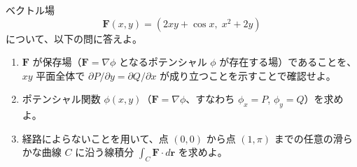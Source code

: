 
ベクトル場
\[
\bm{F}(x,y) = \left(2xy + \cos x,\; x^{2} + 2y\right)
\]
について、以下の問に答えよ。
\begin{enumerate}
\item $\bm{F}$ が保存場（$\bm{F} = \nabla \phi$ となるポテンシャル $\phi$ が存在する場）であることを、$xy$ 平面全体で $\partial P/\partial y = \partial Q/\partial x$ が成り立つことを示すことで確認せよ。
\item ポテンシャル関数 $\phi(x,y)$（$\bm{F} = \nabla \phi$、すなわち $\phi_x = P$, $\phi_y = Q$）を求めよ。
\item 経路によらないことを用いて、点 $(0,0)$ から点 $(1,\pi)$ までの任意の滑らかな曲線 $C$ に沿う線積分 $\displaystyle\int_{C} \bm{F}\cdot d\bm{r}$ を求めよ。
\end{enumerate}
